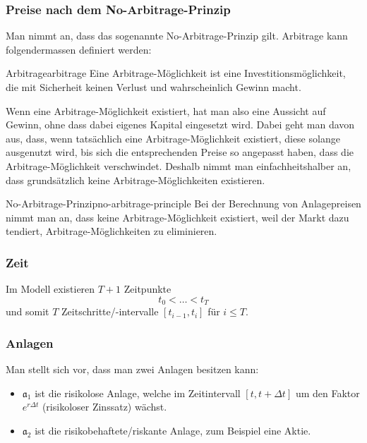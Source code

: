 \documentclass[11pt]{report} %
\begin{document}
\subsubsection*{Preise nach dem No-Arbitrage-Prinzip}
Man nimmt an, dass das sogenannte No-Arbitrage-Prinzip gilt. Arbitrage kann folgendermassen definiert werden:
\begin{Definition}{Arbitrage}{arbitrage}
    Eine Arbitrage-Möglichkeit ist eine Investitionsmöglichkeit, die mit Sicherheit keinen Verlust und wahrscheinlich Gewinn macht.
\end{Definition}
Wenn eine Arbitrage-Möglichkeit existiert, hat man also eine Aussicht auf Gewinn, ohne dass dabei eigenes Kapital eingesetzt wird. Dabei geht man davon aus, dass, wenn tatsächlich eine Arbitrage-Möglichkeit existiert, diese solange ausgenutzt wird, bis sich die entsprechenden Preise so angepasst haben, dass die Arbitrage-Möglichkeit verschwindet. Deshalb nimmt man einfachheitshalber an, dass grundsätzlich keine Arbitrage-Möglichkeiten existieren.
\begin{Definition}{No-Arbitrage-Prinzip}{no-arbitrage-principle}
    Bei der Berechnung von Anlagepreisen nimmt man an, dass keine Arbitrage-Möglichkeit existiert, weil der Markt dazu tendiert, Arbitrage-Möglichkeiten zu eliminieren. 
\end{Definition}

\subsubsection*{Zeit}
Im Modell existieren $T+1$ Zeitpunkte $$t_0<\ldots<t_T$$ und somit $T$ Zeitschritte/-intervalle $[t_{i-1}, t_i]$ für $i\leq T$.

\subsubsection*{Anlagen}
Man stellt sich vor, dass man zwei Anlagen besitzen kann:
\begin{itemize}
    \item $\mathfrak{a}_1$ ist die risikolose Anlage, welche im Zeitintervall $[t, t+\Delta t]$ um den Faktor $e^{r\Delta t}$ (risikoloser Zinssatz) wächst.
    \item $\mathfrak{a}_2$ ist die risikobehaftete/riskante Anlage, zum Beispiel eine Aktie.
\end{itemize}
\end{document}
